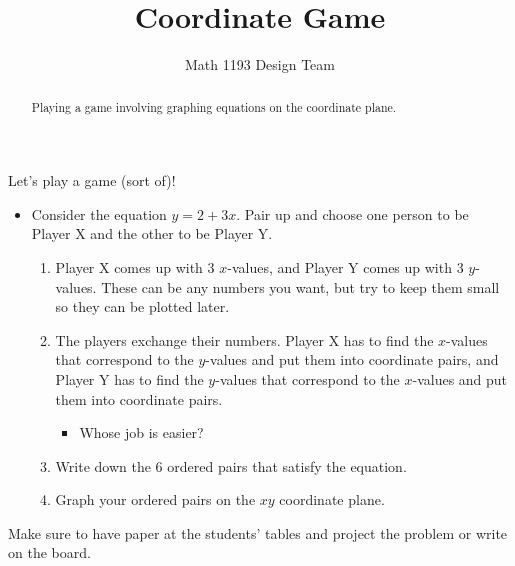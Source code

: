 \documentclass[noauthor]{ximera}
\title{Coordinate Game}
\author{Math 1193 Design Team}
\begin{document}
\begin{abstract}
    Playing a game involving graphing equations on the coordinate plane.
\end{abstract}
\maketitle

Let's play a game (sort of)!

\begin{itemize}
    \item Consider the equation \(y = 2 + 3x\). Pair up and 
    choose one person to be Player X and the other
    to be Player Y.
    \begin{enumerate}
        \item Player X comes up with 3 \(x\)-values, and 
        Player Y comes up with 3 \(y\)-values. 
        These can be any numbers you want, but try 
        to keep them small so they can be plotted 
        later.
        \item The players exchange their numbers. 
        Player X has to find the \(x\)-values that 
        correspond to the \(y\)-values and put 
        them into coordinate pairs, and Player Y 
        has to find the \(y\)-values that 
        correspond to the \(x\)-values and put 
        them into coordinate pairs. 
        \begin{itemize}
            \item Whose job is easier?
        \end{itemize}
        \item Write down the 6 
        ordered pairs that satisfy the equation.
        \item Graph your ordered pairs on the \(xy\)
        coordinate plane.
    \end{enumerate}
\end{itemize}

\begin{instructorNotes}
Make sure to have paper at the students' tables and project
the problem or write on the board.
\end{instructorNotes}
\end{document}
